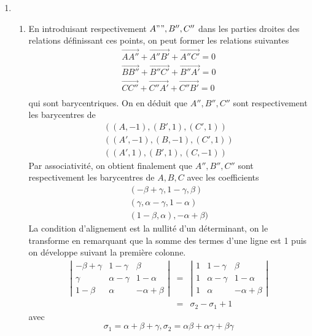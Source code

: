 \begin{enumerate}
  \item
    \begin{enumerate}
      \item En introduisant respectivement $A"",B'',C''$ dans les
      parties droites des relations d{\'e}finissant ces points, on
      peut former les relations suivantes
\begin{eqnarray*}
\overrightarrow{AA''}+\overrightarrow{A''B'}+\overrightarrow{A''C'}=0\\
\overrightarrow{B B''}+\overrightarrow{B''C'}+\overrightarrow{B''A'}=0\\
\overrightarrow{CC''}+\overrightarrow{C''A'}+\overrightarrow{C''B'}=0\\
\end{eqnarray*}
 qui sont barycentriques. On en d{\'e}duit que $A'',B'',C''$ sont respectivement les
 barycentres de
 \begin{eqnarray*}
 ((A,-1),(B',1),(C',1))\\((A',-1),(B,-1),(C',1))\\((A',1),(B',1),(C,-1))
 \end{eqnarray*}
 Par associativit{\'e}, on obtient finalement que $A'',B'',C''$ sont respectivement les
 barycentres de $A,B,C$ avec les coefficients
\begin{eqnarray*}
  (-\beta+\gamma,1-\gamma,\beta)\\
  (\gamma,\alpha-\gamma,1-\alpha)\\
  (1-\beta,\alpha),-\alpha+\beta)
\end{eqnarray*}
La condition d'alignement est la nullit{\'e} d'un d{\'e}terminant, on le
transforme en remarquant que la somme des termes d'une ligne est 1
puis on d{\'e}veloppe suivant la premi{\`e}re colonne.
\begin{eqnarray*}
\left|\begin{array}{ccc}
    -\beta+\gamma & 1-\gamma & \beta\\
  \gamma & \alpha-\gamma & 1-\alpha\\
  1-\beta & \alpha & -\alpha+\beta
  \end{array}\right|  & =&
\left|\begin{array}{ccc}
    1 & 1-\gamma & \beta\\
  1 & \alpha-\gamma & 1-\alpha\\
  1 & \alpha & -\alpha+\beta
  \end{array}\right|\\
  &=&\sigma_2- \sigma_1 +1
\end{eqnarray*}
avec
\[\sigma_1=\alpha+\beta+\gamma,\sigma_2=\alpha\beta+\alpha\gamma+\beta\gamma\]

\end{enumerate}
\end{enumerate}
